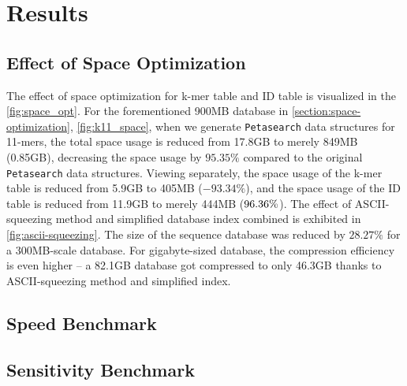 \chapter{Results} \label{chapter:results}


\section{Effect of Space Optimization}

The effect of space optimization for k-mer table and ID table is visualized in the \autoref{fig:space_opt}.
For the forementioned 900MB database in \cref{section:space-optimization}, \autoref{fig:k11_space}, when we generate \texttt{Petasearch} data structures for 11-mers, the total space usage is reduced from 17.8GB to merely 849MB (0.85GB), decreasing the space usage by $95.35\%$ compared to the original \texttt{Petasearch} data structures.
Viewing separately, the space usage of the k-mer table is reduced from 5.9GB to 405MB ($-93.34\%$), and the space usage of the ID table is reduced from 11.9GB to merely 444MB ($\-96.36\%$).
The effect of ASCII-squeezing method and simplified database index combined is exhibited in \autoref{fig:ascii-squeezing}.
The size of the sequence database was reduced by $28.27 \%$ for a 300MB-scale database.
For gigabyte-sized database, the compression efficiency is even higher -- a 82.1GB database got compressed to only 46.3GB thanks to ASCII-squeezing method and simplified index.

\section{Speed Benchmark}



\section{Sensitivity Benchmark}

